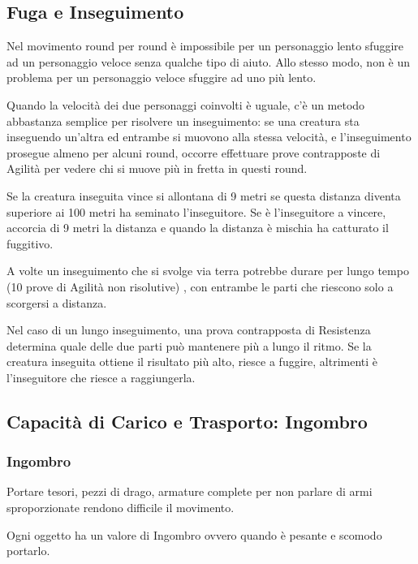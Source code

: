 \documentclass[a4paper,11pt,twoside,openany]{book}
\begin{document}
\subsection{Fuga e Inseguimento}

Nel movimento round per round è impossibile per un personaggio lento sfuggire ad un personaggio veloce senza qualche tipo di aiuto. Allo stesso modo, non è un problema per un personaggio veloce sfuggire ad uno più lento.

Quando la velocità dei due personaggi coinvolti è uguale, c'è un metodo abbastanza semplice per risolvere un inseguimento: se una creatura sta inseguendo un'altra ed entrambe si muovono alla stessa velocità, e l'inseguimento prosegue almeno per alcuni round, occorre effettuare prove contrapposte di Agilità per vedere chi si muove più in fretta in questi round.

Se la creatura inseguita vince si allontana di 9 metri se questa distanza diventa superiore ai 100 metri ha seminato l'inseguitore. Se è l'inseguitore a vincere, accorcia di 9 metri la distanza e quando la distanza è mischia ha catturato il fuggitivo.

A volte un inseguimento che si svolge via terra potrebbe durare per lungo tempo (10 prove di Agilità non risolutive) , con entrambe le parti che riescono solo a scorgersi a distanza.

Nel caso di un lungo inseguimento, una prova contrapposta di Resistenza determina quale delle due parti può mantenere più a lungo il ritmo. Se la creatura inseguita ottiene il risultato più alto, riesce a fuggire, altrimenti è l'inseguitore che riesce a raggiungerla.

\subsection{Capacità di Carico e Trasporto: Ingombro}

\label{capacituxe0-di-carico-e-trasporto-ingombro}

\subsubsection{Ingombro}

Portare tesori, pezzi di drago, armature complete per non parlare di armi sproporzionate rendono difficile il movimento.

Ogni oggetto ha un valore di Ingombro ovvero quando è pesante e scomodo portarlo.
\end{document}
